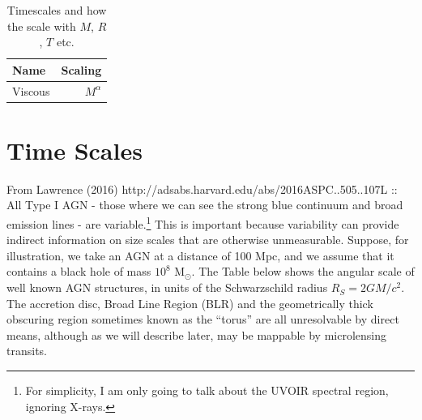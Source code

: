 \documentclass[11pt]{article}
\begin{document}
\begin{table}
  \caption{Timescales and how the scale with $M$, $R$, $T$ etc.}
  \label{tab:the_lines}
  \begin{center}
    \begin{tabular}{lr} 
      \hline
      \hline
      Name & Scaling \\ 
      \hline
      Viscous & $M^{\alpha}$ \\
     \hline
      \hline
   \end{tabular}
  \end{center}
\end{table}

\citet{Croom2004}
\noindent




\newpage
\section{Time Scales}
From Lawrence (2016) http://adsabs.harvard.edu/abs/2016ASPC..505..107L :: \\
All Type I AGN - those where we can see the strong blue continuum and
broad emission lines - are variable.\footnote{For simplicity, I am
only going to talk about the UVOIR spectral region, ignoring X-rays.}
This is important because variability can provide indirect information
on size scales that are otherwise unmeasurable. Suppose, for
illustration, we take an AGN at a distance of 100 Mpc, and we assume
that it contains a black hole of mass $10^8$ M$_\odot$. The Table
below shows the angular scale of well known AGN structures, in units
of the Schwarzschild radius $R_S=2GM/c^2$. The accretion disc, Broad
Line Region (BLR) and the geometrically thick obscuring region
sometimes known as the ``torus'' are all unresolvable by direct means,
although as we will describe later, may be mappable by microlensing
transits.
\end{document}
